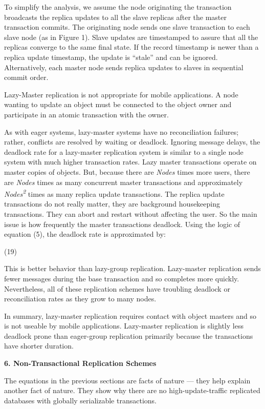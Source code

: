 \documentclass[a4paper,11pt,twoside,openright]{article}
\begin{document}
To simplify the analysis, we assume the node originating the transaction
broadcasts the replica updates to all the slave replicas after the
master transaction commits. The originating node sends one slave
transaction to each slave node (as in Figure 1). Slave updates are
timestamped to assure that all the replicas converge to the same final
state. If the record timestamp is newer than a replica update timestamp,
the update is ``stale'' and can be ignored. Alternatively, each master
node sends replica updates to slaves in sequential commit order.

Lazy-Master replication is not appropriate for mobile applications. A
node wanting to update an object must be connected to the object owner
and participate in an atomic transaction with the owner.

As with eager systems, lazy-master systems have no reconciliation
failures; rather, conflicts are resolved by waiting or deadlock.
Ignoring message delays, the deadlock rate for a lazy-master replication
system is similar to a single node system with much higher transaction
rates. Lazy master transactions operate on master copies of objects.
But, because there are \emph{Nodes} times more users, there are
\emph{Nodes} times as many concurrent master transactions and
approximately \emph{Nodes\textsuperscript{2}} times as many replica
update transactions. The replica update transactions do not really
matter, they are background housekeeping transactions. They can abort
and restart without affecting the user. So the main issue is how
frequently the master transactions deadlock. Using the logic of equation
(5), the deadlock rate is approximated by:

(19)

This is better behavior than lazy-group replication. Lazy-master
replication sends fewer messages during the base transaction and so
completes more quickly. Nevertheless, all of these replication schemes
have troubling deadlock or reconciliation rates as they grow to many
nodes.

In summary, lazy-master replication requires contact with object masters
and so is not useable by mobile applications. Lazy-master replication is
slightly less deadlock prone than eager-group replication primarily
because the transactions have shorter duration.

\textbf{6. Non-Transactional Replication Schemes}

The equations in the previous sections are facts of nature --- they help
explain another fact of nature. They show why there are no
high-update-traffic replicated databases with globally serializable
transactions.
\end{document}

